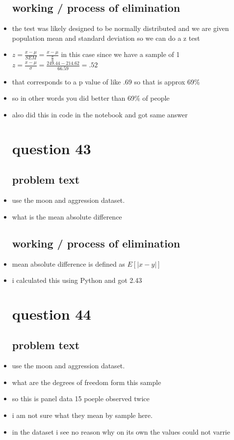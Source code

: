\documentclass{article}
\begin{document}
\begin{itemize}
\subsection{working / process of elimination }
\item the test was likely designed to be normally distributed and we are given population mean and standard deviation so we can do a z test
\item $z=\frac{x-\mu}{SEM}=\frac{x-\mu}{\frac{\sigma}{n}}$ in this case since we have a sample of 1 $z=\frac{x-\mu}{\sigma}=\frac{249.44-214.62}{66.59}=.52$
\item that corresponds to a p value of like .69 so that is approx 69\%
\item so in other words you did better than 69\% of people 
\item also did this in code in the notebook and got same answer

\section{question 43}
\subsection{problem text}
\item  use the moon and aggression dataset.
\item what is the mean absolute difference

\subsection{working / process of elimination }
\item mean absolute difference is defined as $E[|x-y|]$
\item i calculated this using Python and got 2.43


\section{question 44}
\subsection{problem text}
\item  use the moon and aggression dataset. 
\item what are the degrees of freedom form this sample
\item so this is panel data 15 poeple observed twice
\item i am not sure what they mean by sample here. 
\item in the dataset i see no reason why on its own the values could not varrie 

\end{itemize}
\end{document}
